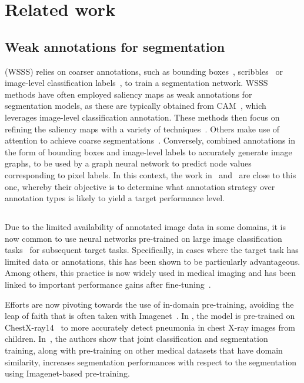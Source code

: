\section{Related work}
\label{sec:related}

\subsection{Weak annotations for segmentation}
 (WSSS) relies on coarser annotations, such as bounding boxes~, scribbles~ or image-level classification labels~, to train a segmentation network. WSSS methods have often employed saliency maps as weak annotations for segmentation models, as these are typically obtained from CAM~, which leverages image-level classification annotation. These methods then focus on refining the saliency maps with a variety of techniques~. Others make use of attention to achieve coarse segmentations~. Conversely,  combined annotations in the form of bounding boxes and image-level labels to accurately generate image graphs, to be used by a graph neural network to predict node values corresponding to pixel labels. In this context, the work in~ and~ are close to this one, whereby their objective is to determine what annotation strategy over annotation types is likely to yield a target performance level. 

\subsection{}
Due to the limited availability of annotated image data in some domains, it is now common to use neural networks pre-trained on large image classification tasks~ for subsequent target tasks. Specifically, in cases where the target task has limited data or annotations, this has been shown to be particularly advantageous. Among others, this practice is now widely used in medical imaging and has been linked to important performance gains after fine-tuning~.

Efforts are now pivoting towards the use of in-domain pre-training, avoiding the leap of faith that is often taken with Imagenet~. In , the model is pre-trained on ChestX-ray14~ to more accurately detect pneumonia in chest X-ray images from children. In~, the authors show that joint classification and segmentation training, along with pre-training on other medical datasets that have domain similarity, increases segmentation performances with respect to the segmentation using Imagenet-based pre-training.

